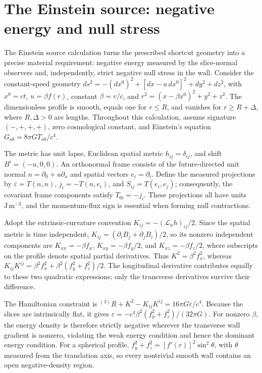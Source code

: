 \documentclass[11pt]{article}
\begin{document}
\section{The Einstein source: negative energy and null stress}
The Einstein source calculation turns the prescribed shortcut geometry into a precise material requirement: negative energy measured by the slice-normal observers and, independently, strict negative null stress in the wall. Consider the constant-speed geometry $ds^2=-(dx^0)^2+[dx-u\,dx^0]^2+dy^2+dz^2$, with $x^0=ct$, $u=\beta f(r)$, constant $\beta=v/c$, and $r^2=(x-\beta x^0)^2+y^2+z^2$. The dimensionless profile is smooth, equals one for $r\leq R$, and vanishes for $r\geq R+\Delta$, where $R,\Delta>0$ are lengths. Throughout this calculation, assume signature $(-,+,+,+)$, zero cosmological constant, and Einstein\textquoteright{}s equation $G_{ab}=8\pi G T_{ab}/c^4$.

The metric has unit lapse, Euclidean spatial metric $h_{ij}=\delta_{ij}$, and shift $B^i=(-u,0,0)$. An orthonormal frame consists of the future-directed unit normal $n=\partial_0+u\partial_x$ and spatial vectors $e_i=\partial_i$. Define the measured projections by $\varepsilon=T(n,n)$, $j_i=-T(n,e_i)$, and $S_{ij}=T(e_i,e_j)$; consequently, the covariant frame components satisfy $T_{0i}=-j_i$. These projections all have units $\mathrm{J\,m^{-3}}$, and the momentum-flux sign is essential when forming null contractions.

Adopt the extrinsic-curvature convention $K_{ij}=-(\mathcal L_n h)_{ij}/2$. Since the spatial metric is time independent, $K_{ij}=(\partial_i B_j+\partial_j B_i)/2$, so its nonzero independent components are $K_{xx}=-\beta f_x$, $K_{xy}=-\beta f_y/2$, and $K_{xz}=-\beta f_z/2$, where subscripts on the profile denote spatial partial derivatives. Thus $K^2=\beta^2 f_x^2$, whereas $K_{ij}K^{ij}=\beta^2 f_x^2+\beta^2(f_y^2+f_z^2)/2$. The longitudinal derivative contributes equally to these two quadratic expressions; only the transverse derivatives survive their difference.

The Hamiltonian constraint is ${}^{(3)}R+K^2-K_{ij}K^{ij}=16\pi G\varepsilon/c^4$. Because the slices are intrinsically flat, it gives $\varepsilon=-c^4\beta^2(f_y^2+f_z^2)/(32\pi G)$. For nonzero $\beta$, the energy density is therefore strictly negative wherever the transverse wall gradient is nonzero, violating the weak energy condition and hence the dominant energy condition. For a spherical profile, $f_y^2+f_z^2=[f'(r)]^2\sin^2\theta$, with $\theta$ measured from the translation axis, so every nontrivial smooth wall contains an open negative-density region.
\end{document}
